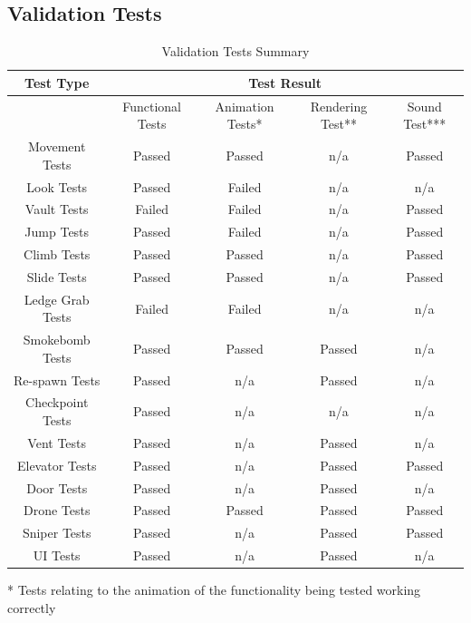 \documentclass[11pt,a4paper]{article}
\begin{document}
\subsection{Validation Tests}
\begin{table}[H]
	\begin{center}
		\caption{Validation Tests Summary}
		\label{table:validation_tests}
		\begin{tabular}{ |c|c|c|c|c| } 
			\hline
			Test Type & \multicolumn{4}{|c|}{Test Result}\\ \hline
			& Functional Tests & Animation Tests* & Rendering Test** & Sound Test***\\ \hline
			Movement Tests & Passed & Passed & n/a & Passed\\ \hline
			Look Tests & Passed & Failed & n/a& n/a\\ \hline
			Vault Tests & Failed & Failed & n/a& Passed\\ \hline
			Jump Tests & Passed & Failed & n/a& Passed\\ \hline
			Climb Tests & Passed & Passed & n/a& Passed\\ \hline
			Slide Tests & Passed & Passed & n/a& Passed\\ \hline
			Ledge Grab Tests & Failed & Failed & n/a& n/a\\ \hline
			Smokebomb Tests & Passed & Passed & Passed& n/a\\ \hline
			Re-spawn Tests & Passed & n/a & Passed& n/a\\ \hline
			Checkpoint Tests & Passed & n/a & n/a& n/a\\ \hline
			Vent Tests & Passed & n/a & Passed& n/a\\ \hline
			Elevator Tests & Passed & n/a & Passed& Passed\\ \hline
			Door Tests & Passed & n/a & Passed& n/a\\ \hline
			Drone Tests & Passed & Passed & Passed& Passed\\ \hline
			Sniper Tests & Passed & n/a & Passed& Passed\\ \hline
			UI Tests & Passed & n/a & Passed& n/a\\ \hline
		\end{tabular}
	\end{center}
\end{table}
* Tests relating to the animation of the functionality being tested working correctly\\
\end{document}
